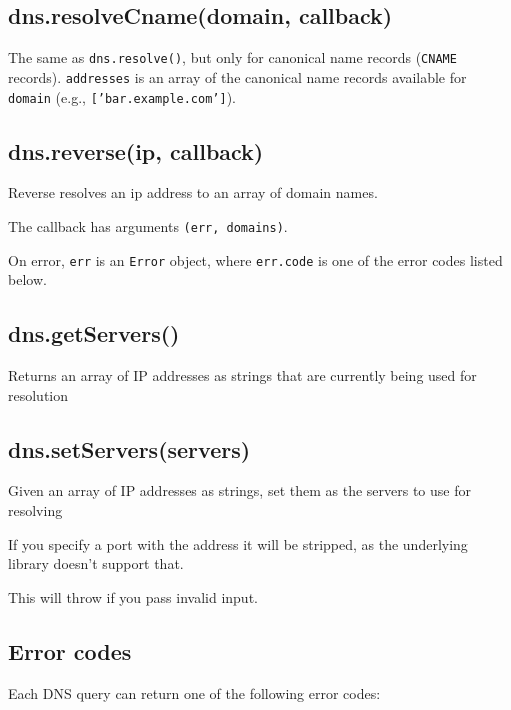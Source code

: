 \subsection{dns.resolveCname(domain, callback)}

The same as \texttt{dns.resolve()}, but only for canonical name records
(\texttt{CNAME} records). \texttt{addresses} is an array of the
canonical name records available for \texttt{domain} (e.g.,
\texttt{{[}'bar.example.com'{]}}).

\subsection{dns.reverse(ip, callback)}

Reverse resolves an ip address to an array of domain names.

The callback has arguments \texttt{(err, domains)}.

On error, \texttt{err} is an \texttt{Error} object, where
\texttt{err.code} is one of the error codes listed below.

\subsection{dns.getServers()}

Returns an array of IP addresses as strings that are currently being
used for resolution

\subsection{dns.setServers(servers)}

Given an array of IP addresses as strings, set them as the servers to
use for resolving

If you specify a port with the address it will be stripped, as the
underlying library doesn't support that.

This will throw if you pass invalid input.

\subsection{Error codes}

Each DNS query can return one of the following error codes:

